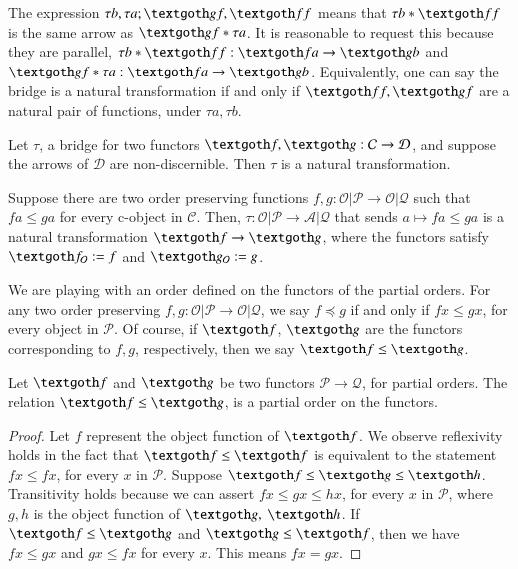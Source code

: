 \documentclass [12pt]{book}
\begin{document}
The expression $\tau b,\tau a;\textgoth gf,\textgoth ff$ means that $\tau b*\textgoth ff$ is the same arrow as $\textgoth gf*\tau a$. It is reasonable to request this because they are parallel, $\tau b*\textgoth ff:\textgoth fa\rightarrow\textgoth gb$ and $\textgoth gf*\tau a:\textgoth fa\rightarrow\textgoth gb$. Equivalently, one can say the bridge is a natural transformation if and only if $\textgoth ff,\textgoth gf$ are a natural pair of functions, under $\tau a,\tau b$.

\begin{proposition}Let $\tau$, a bridge for two functors $\textgoth f,\textgoth g:\mathcal C\rightarrow\mathcal D$, and suppose the arrows of $\mathcal D$ are non-discernible. Then $\tau$ is a natural transformation.\label{nat tran 1}\end{proposition}

\begin{corollary}Suppose there are two order preserving functions $f,g:\mathcal{O|P}\rightarrow\mathcal{O|Q}$ such that $fa\leq ga$ for every c-object in $\mathcal C$. Then, $\tau:\mathcal{O|P}\rightarrow\mathcal{A|Q}$ that sends $a\mapsto fa\leq ga$ is a natural transformation $\textgoth f\rightarrow\textgoth g$, where the functors satisfy $\textgoth f_\mathcal O:=f$ and $\textgoth g_\mathcal O:=g$.\end{corollary}

We are playing with an order defined on the functors of the partial orders. For any two order preserving $f,g:\mathcal{O|P}\rightarrow\mathcal{O|Q}$, we say $f\preceq g$ if and only if $fx\leq gx$, for every object in $\mathcal P$. Of course, if $\textgoth f$, $\textgoth g$ are the functors corresponding to $f,g$, respectively, then we say $\textgoth f\leq\textgoth g$.

\begin{proposition}\label{prop order funct order}Let $\textgoth f$ and $\textgoth g$ be two functors $\mathcal P\rightarrow\mathcal Q$, for partial orders. The relation $\textgoth f\leq\textgoth g$, is a partial order on the functors.\end{proposition}

\begin{proof}Let $f$ represent the object function of $\textgoth f$. We observe reflexivity holds in the fact that $\textgoth f\leq\textgoth f$ is equivalent to the statement $fx\leq fx$, for every $x$ in $\mathcal P$. Suppose $\textgoth f\leq\textgoth g\leq\textgoth h$. Transitivity holds because we can assert $fx\leq gx\leq hx$, for every $x$ in $\mathcal P$, where $g,h$ is the object function of $\textgoth g,~\textgoth h$. If $\textgoth f\leq\textgoth g$ and $\textgoth g\leq\textgoth f$, then we have $fx\leq gx$ and $gx\leq fx$ for every $x$. This means $fx=gx$.\end{proof}
\end{document}
